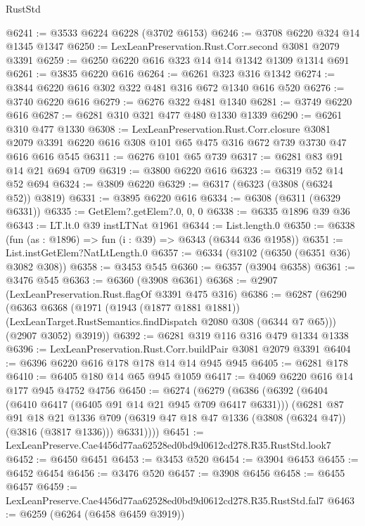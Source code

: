 \begin{lexlean}{RustStd}
\begin{coremodule}
@6241 := @3533 @6224 @6228 (@3702 @6153)
@6246 := @3708 @6220 @324 @14 @1345 @1347
@6250 := LexLeanPreservation.Rust.Corr.second @3081 @2079 @3391
@6259 := @6250 @6220 @616 @323 @14 @14 @1342 @1309 @1314 @691
@6261 := @3835 @6220 @616
@6264 := @6261 @323 @316 @1342
@6274 := @3844 @6220 @616 @302 @322 @481 @316 @672 @1340 @616 @520
@6276 := @3740 @6220 @616
@6279 := @6276 @322 @481 @1340
@6281 := @3749 @6220 @616
@6287 := @6281 @310 @321 @477 @480 @1330 @1339
@6290 := @6261 @310 @477 @1330
@6308 := LexLeanPreservation.Rust.Corr.closure
    @3081
    @2079
    @3391
    @6220
    @616
    @308
    @101
    @65
    @475
    @316
    @672
    @739
    @3730
    @47
    @616
    @616
    @545
@6311 := @6276 @101 @65 @739
@6317 := @6281 @83 @91 @14 @21 @694 @709
@6319 := @3800 @6220 @616
@6323 := @6319 @52 @14 @52 @694
@6324 := @3809 @6220
@6329 := @6317 (@6323 (@3808 (@6324 @52)) @3819)
@6331 := @3895 @6220 @616
@6334 := @6308 (@6311 (@6329 @6331))
@6335 := GetElem?.getElem?.{0, 0, 0}
@6338 := @6335 @1896 @39 @36
@6343 := LT.lt.{0} @39 instLTNat @1961
@6344 := List.length.{0}
@6350 := @6338 (fun (as : @1896) => fun (i : @39) => @6343 (@6344 @36 @1958))
@6351 := List.instGetElem?NatLtLength.{0}
@6357 := @6334 (@3102 (@6350 (@6351 @36) @3082 @308))
@6358 := @3453 @545
@6360 := @6357 (@3904 @6358)
@6361 := @3476 @545
@6363 := @6360 (@3908 @6361)
@6368 := @2907 (LexLeanPreservation.Rust.flagOf @3391 @475 @316)
@6386 := @6287
    (@6290
      (@6363
        @6368
        (@1971
          (@1943 (@1877 @1881 @1881))
          (LexLeanTarget.RustSemantics.findDispatch @2080 @308 (@6344 @7 @65)))
        (@2907 @3052)
        @3919))
@6392 := @6281 @319 @116 @316 @479 @1334 @1338
@6396 := LexLeanPreservation.Rust.Corr.buildPair @3081 @2079 @3391
@6404 := @6396 @6220 @616 @178 @178 @14 @14 @945 @945
@6405 := @6281 @178
@6410 := @6405 @180 @14 @65 @945 @1059
@6417 := @4069 @6220 @616 @14 @177 @945 @4752 @4756
@6450 := @6274
    (@6279
      (@6386
        (@6392
          (@6404 (@6410 @6417 (@6405 @91 @14 @21 @945 @709 @6417 @6331)))
          (@6281
            @87
            @91
            @18
            @21
            @1336
            @709
            (@6319 @47 @18 @47 @1336 (@3808 (@6324 @47)) (@3816 (@3817 @1336)))
            @6331))))
@6451 := LexLeanPreserve.Cae4456d77aa62528ed0bd9d0612cd278.R35.RustStd.look7
@6452 := @6450 @6451
@6453 := @3453 @520
@6454 := @3904 @6453
@6455 := @6452 @6454
@6456 := @3476 @520
@6457 := @3908 @6456
@6458 := @6455 @6457
@6459 := LexLeanPreserve.Cae4456d77aa62528ed0bd9d0612cd278.R35.RustStd.fal7
@6463 := @6259 (@6264 (@6458 @6459 @3919))

\end{coremodule}
\end{lexlean}
